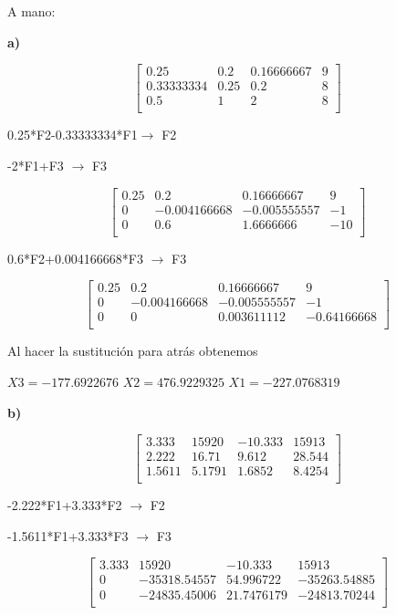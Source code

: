 \documentclass[12pt]{article}
\begin{document}
A mano:


\textbf{a)}

\[
\begin{bmatrix}
0.25 & 0.2 & 0.16666667 & 9 \\
0.33333334 & 0.25 & 0.2 & 8 \\
0.5 & 1 & 2 & 8 \\
\end{bmatrix}
\]

0.25*F2-0.33333334*F1$\longrightarrow $ F2

-2*F1+F3 $\longrightarrow $ F3

\[
\begin{bmatrix}
0.25 & 0.2 & 0.16666667 & 9 \\
0 & -0.004166668 & -0.005555557 & -1 \\
0 & 0.6 & 1.6666666 & -10 \\
\end{bmatrix}
\]

0.6*F2+0.004166668*F3 $\longrightarrow $ F3

\[
\begin{bmatrix}
0.25 & 0.2 & 0.16666667 & 9 \\
0 & -0.004166668 & -0.005555557 & -1 \\
0 & 0 & 0.003611112 & -0.64166668 \\
\end{bmatrix}
\]

Al hacer la sustitución para atrás obtenemos

$X3 = -177.6922676$   $X2 =476.9229325$  $X1 =-227.0768319$ 

\textbf{b)}

\[
\begin{bmatrix}
3.333 & 15920 & -10.333 & 15913\\
2.222 & 16.71 & 9.612 & 28.544 \\
1.5611 & 5.1791 & 1.6852 & 8.4254\\
\end{bmatrix}
\]

-2.222*F1+3.333*F2  $\longrightarrow $ F2

-1.5611*F1+3.333*F3 $\longrightarrow $ F3

\[
\begin{bmatrix}
3.333 & 15920 & -10.333 & 15913\\
0 & -35318.54557 & 54.996722 & -35263.54885 \\
0 & -24835.45006 & 21.7476179 & -24813.70244\\
\end{bmatrix}
\]
\end{document}
